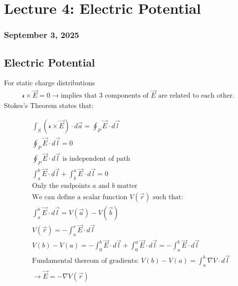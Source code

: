 \documentclass{article}
\begin{document}
\newpage
\section{Lecture 4: Electric Potential}
\subsubsection*{September 3, 2025}

\subsection{Electric Potential}
For static charge distributions
\begin{align*}
    \mathcal{r}\times\vec{E} = 0 \rightarrow \text{implies that 3 components of $\vec{E}$ are related to each other.}
\end{align*}
Stokes's Theorem states that:
\begin{center}
\begin{align*}
    &\int_S (\mathcal{r} \times \vec{E}) \cdot d\vec{a} = \oint_P \vec{E} \cdot d\vec{l} \\[1.5ex]
    &\oint_P \vec{E} \cdot d\vec{l} = 0 \\[1.5ex]
    &\oint_P \vec{E} \cdot d\vec{l} \text{ is independent of path} \\[1.5ex]
    &\int_a^b \vec{E} \cdot d\vec{l} + \int_b^a \vec{E} \cdot d\vec{l} = 0 \\[1.5ex]
    &\text{Only the endpoints $a$ and $b$ matter} \\[1.5ex]
    &\text{We can define a scalar function $V(\vec{r})$ such that:} \\[0.5ex]
    &\int_a^b \vec{E} \cdot d\vec{l} = V(\vec{a}) - V(\vec{b}) \\
    &V(\vec{r}) = - \int_a^r \vec{E} \cdot d\vec{l} \\
    &V(b)-V(a)=-\int_0^b \vec{E} \cdot d\vec{l}+\int_0^a \vec{E} \cdot d\vec{l}=-\int_a^b \vec{E} \cdot d\vec{l} \\
    &\text{Fundamental thereom of gradients: } V(b)-V(a)=\int_a^b\nabla V\cdot d\vec{l} \\
    &\rightarrow \vec{E}=-\nabla V(\vec{r})
\end{align*}
\end{center}
\end{document}
